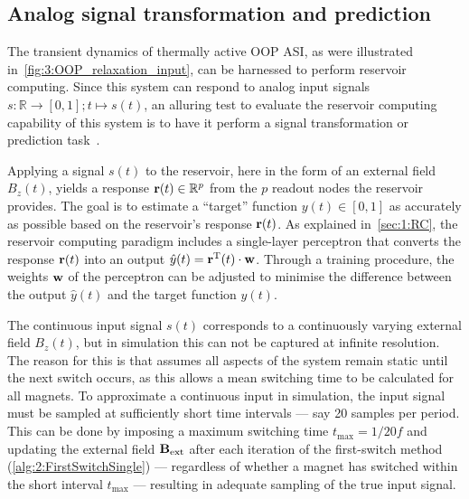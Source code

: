 \subsection{Analog signal transformation and prediction}
The transient dynamics of thermally active OOP ASI, as were illustrated in~\cref{fig:3:OOP_relaxation_input}, can be harnessed to perform reservoir computing.
Since this system can respond to analog input signals $s: \mathbb{R} \rightarrow [0, 1]; t \mapsto s(t)$, an alluring test to evaluate the reservoir computing capability of this system is to have it perform a signal transformation or prediction task~\cite{gartside2022reconfigurable,AdaptiveProgrammableRC,RC_NNN,TaskAdaptivePRC}. \par %
Applying a signal $s(t)$ to the reservoir, here in the form of an external field $B_z(t)$, yields a response $\boldsymbol{\mathbf{r}}(t) \in \mathbb{R}^p$ from the $p$ readout nodes the reservoir provides.
The goal is to estimate a ``target'' function $y(t) \in [0,1]$ as accurately as possible based on the reservoir's response $\boldsymbol{\mathbf{r}}(t)$.
As explained in~\cref{sec:1:RC}, the reservoir computing paradigm includes a single-layer perceptron that converts the response $\boldsymbol{\mathbf{r}}(t)$ into an output $\hat{y}(t) = \boldsymbol{\mathbf{r}}^\mathrm{T}(t) \cdot \boldsymbol{\mathbf{w}}$.
Through a training procedure, the weights $\boldsymbol{\mathbf{w}}$ of the perceptron can be adjusted to minimise the difference between the output $\hat{y}(t)$ and the target function $y(t)$. \par
The continuous input signal $s(t)$ corresponds to a continuously varying external field $B_z(t)$, but in simulation this can not be captured at infinite resolution.
The reason for this is that \hotspice assumes all aspects of the system remain static until the next switch occurs, as this allows a mean switching time to be calculated for all magnets.
To approximate a continuous input in simulation, the input signal must be sampled at sufficiently short time intervals --- say 20 samples per period.
This can be done by imposing a maximum switching time $t_\mathrm{max} = 1/20f$ and updating the external field $\boldsymbol{\mathbf{B}}_\mathrm{ext}$ after each iteration of the first-switch method (\cref{alg:2:FirstSwitchSingle}) --- regardless of whether a magnet has switched within the short interval $t_\mathrm{max}$ --- resulting in adequate sampling of the true input signal. \\\par

